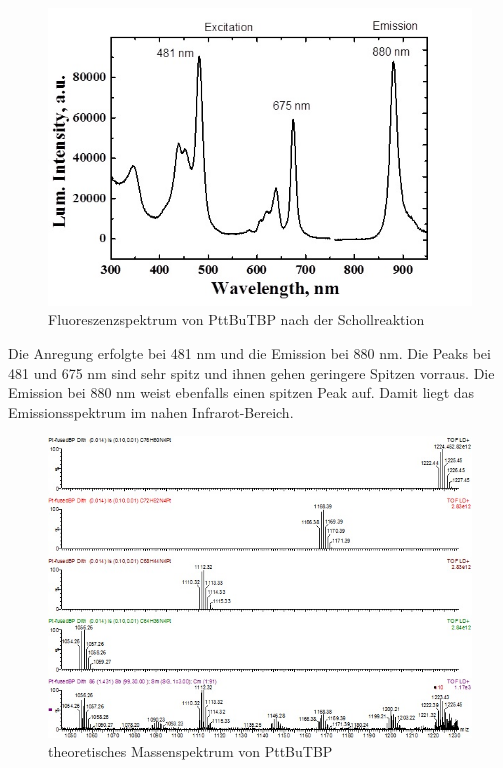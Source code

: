 \begin{figure}[!htpb]
\centering
\includegraphics[scale=0.5]{graphics/PttBuTBPafterschollreaction}
\caption{Fluoreszenzspektrum von PttBuTBP nach der Schollreaktion}
\end{figure}
Die Anregung erfolgte bei 481 nm und die Emission bei 880 nm. Die Peaks bei 481 und 675 nm sind sehr spitz und ihnen gehen geringere Spitzen vorraus. Die Emission bei 880 nm weist ebenfalls einen spitzen Peak auf. Damit liegt das Emissionsspektrum im nahen Infrarot-Bereich.


\begin{figure}[!htpb]
\centering
\includegraphics[scale=1]{graphics/PttBuTBPmassspktrum2}
\caption{theoretisches Massenspektrum von PttBuTBP}
\end{figure}

